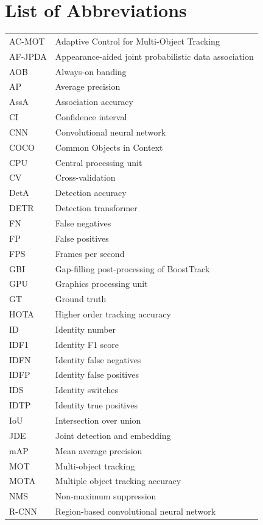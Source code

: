 \chapter*{List of Abbreviations}

\begin{longtable}{ll}
AC-MOT & Adaptive Control for Multi-Object Tracking \\
AF-JPDA & Appearance-aided joint probabilistic data association \\
AOB & Always-on banding \\
AP & Average precision \\
AssA & Association accuracy \\
CI & Confidence interval \\
CNN & Convolutional neural network \\
COCO & Common Objects in Context \\
CPU & Central processing unit \\
CV & Cross-validation \\
DetA & Detection accuracy \\
DETR & Detection transformer \\
FN & False negatives \\
FP & False positives \\
FPS & Frames per second \\
GBI & Gap-filling post-processing of BoostTrack \\
GPU & Graphics processing unit \\
GT & Ground truth \\
HOTA & Higher order tracking accuracy \\
ID & Identity number \\
IDF1 & Identity F1 score \\
IDFN & Identity false negatives \\
IDFP & Identity false positives \\
IDS & Identity switches \\
IDTP & Identity true positives \\
IoU & Intersection over union \\
JDE & Joint detection and embedding \\
mAP & Mean average precision \\
MOT & Multi-object tracking \\
MOTA & Multiple object tracking accuracy \\
NMS & Non-maximum suppression \\
R-CNN & Region-based convolutional neural network \\

\end{longtable}
